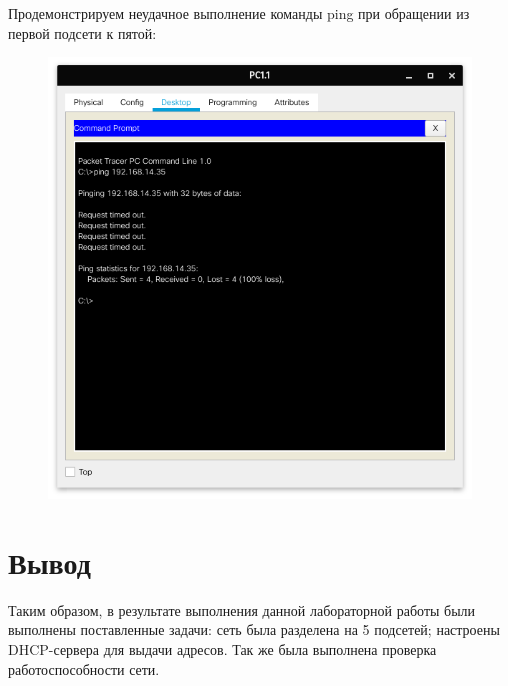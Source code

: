 Продемонстрируем неудачное выполнение команды ping при обращении из первой подсети к пятой:
\begin{figure}[H]
    \centering
    \includegraphics[width=0.8\linewidth]{images/src08.png}
\end{figure}

\chapter{Вывод}%
\label{cha:vyvod}

Таким образом, в результате выполнения данной лабораторной работы были выполнены поставленные задачи: сеть была разделена на 5 подсетей; настроены DHCP-сервера для выдачи адресов. Так же была выполнена проверка работоспособности сети.
